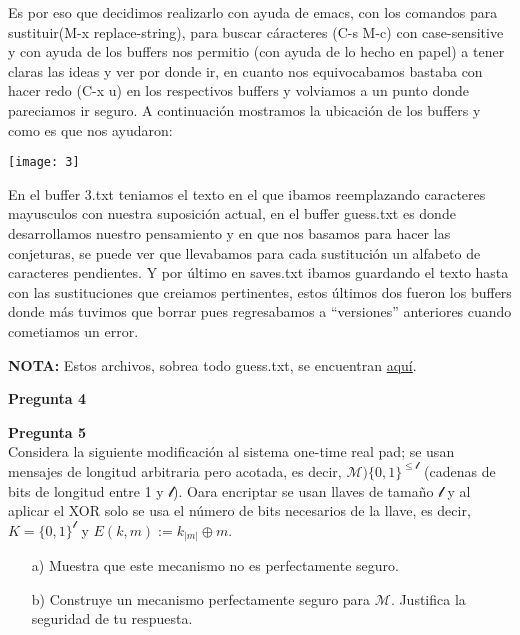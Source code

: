 \documentclass{article}
\newenvironment{problem}[2][Pregunta]
    { \begin{mdframed}[backgroundcolor=gray!20] \textbf{#1 #2} \\}
    {  \end{mdframed}}
\begin{document}
Es por eso que decidimos realizarlo con ayuda de emacs, con los comandos para sustituir(M-x replace-string),
para buscar cáracteres (C-s M-c) con case-sensitive y con ayuda de los buffers nos permitio
(con ayuda de lo hecho en papel) a tener claras las ideas y ver por donde ir, en cuanto nos equivocabamos
bastaba con hacer redo (C-x u) en los respectivos buffers y volviamos a un punto donde
pareciamos ir seguro. A continuación mostramos la ubicación de los buffers y como es que nos ayudaron:


\texttt{[image: 3]}

En el buffer 3.txt teniamos el texto en el que ibamos reemplazando caracteres mayusculos con nuestra
suposición actual, en el buffer guess.txt es donde desarrollamos nuestro pensamiento y en que nos basamos
para hacer las conjeturas, se puede ver que llevabamos para cada sustitución un alfabeto de caracteres pendientes.
Y por último en saves.txt ibamos guardando el texto hasta con las sustituciones que creiamos pertinentes,
estos últimos dos fueron los buffers donde más tuvimos que borrar pues regresabamos a ``versiones'' anteriores
cuando cometiamos un error.


{\large{\bf *NOTA:}} Estos archivos, sobrea todo guess.txt, se encuentran
\href{https://github.com/DiegoMendezMedina/Cripto-Seguridad/tree/main/Tareas/01/src/3}{aquí}.



\begin{problem}{4}
  
\end{problem}

\begin{problem}{5}
  Considera la siguiente modificación al sistema one-time real pad; se usan mensajes de longitud
  arbitraria pero acotada, es decir, $\mathcal{M} ) \{0,1\}^{\leq\mathcal{l}}$ (cadenas de bits de
  longitud entre 1 y $\mathcal{l}$). Oara encriptar se usan llaves de tamaño $\mathcal{l}$ y
  al aplicar el {\rm XOR} solo se usa el número de bits necesarios de la llave, es decir,
  $K = \{0,1\}^\mathcal{l}$ y $E(k,m):=k_{|m|} \oplus m$.

  \begin{enumerate}
  \item[a)] Muestra que este mecanismo no es perfectamente seguro.
    
  \item[b)] Construye un mecanismo perfectamente seguro para $\mathcal{M}$.
    Justifica la seguridad de tu respuesta.
  \end{enumerate}
\end{problem}
\end{document}
